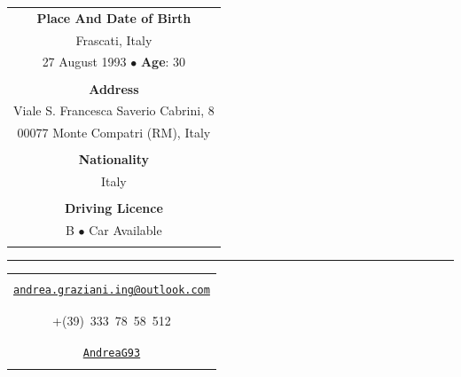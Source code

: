 \documentclass[english,10pt,a4paper]{article}
\newcommand{\CvBulletForSidebar}{\hspace{0.05cm}\textcolor{CvSidebarTextColor}{$\bullet$}\hspace{0.05cm}
	}
\begin{document}
\begin{paracol}{2}
\begin{tcolorbox}[colback=CvSidebarBackColor,height=\textheight,boxrule=0pt, left=0pt,right=0pt,top=0pt,bottom=0pt, arc=0pt,outer arc=0pt]
		\begin{tabular}{c}
			\\
			\textcolor{CvSidebarTextColor}{\textbf{Place And Date of Birth}} \\
			\textcolor{CvSidebarTextColor}{Frascati, Italy} \\
			\textcolor{CvSidebarTextColor}{27 August 1993 \CvBulletForSidebar \textbf{Age}: 30} \\		
			\\
			\textcolor{CvSidebarTextColor}{\textbf{Address}} \\
		    \textcolor{CvSidebarTextColor}{Viale S. Francesca Saverio Cabrini, 8} \\
	        \textcolor{CvSidebarTextColor}{00077 Monte Compatri (RM), Italy} \\
			\\
			\textcolor{CvSidebarTextColor}{\textbf{Nationality}} \\		
			\textcolor{CvSidebarTextColor}{Italy} \\\\		
			\textcolor{CvSidebarTextColor}{\textbf{Driving Licence}} \\		
			\textcolor{CvSidebarTextColor}{B \CvBulletForSidebar Car Available} \\\\	
		\end{tabular}
	
		\textcolor{CvSidebarTextColor}{\rule[.5\baselineskip]{0.9\textwidth}{1.5pt}}
		
		\begin{tabular}{c}
			\\
			{\large \textcolor{CvSidebarTextColor}{\faEnvelope}} \\ \href{mailto:andrea.graziani.ing@outlook.com}{\textcolor{CvSidebarTextColor}{\texttt{andrea.graziani.ing@outlook.com}}} \\\\
			
			{\large \textcolor{CvSidebarTextColor}{\faPhone}} \\ 
			\textcolor{CvSidebarTextColor}{+(39)~333~78~58~512} \\\\
			
			{\large \textcolor{CvSidebarTextColor}{\textsc{\faGithub}}} \\ \href{https://github.com/AndreaG93}{\textcolor{CvSidebarTextColor}{\texttt{AndreaG93}}} \\\\
			

\end{tabular}
\end{tcolorbox}
\end{paracol}
\end{document}
